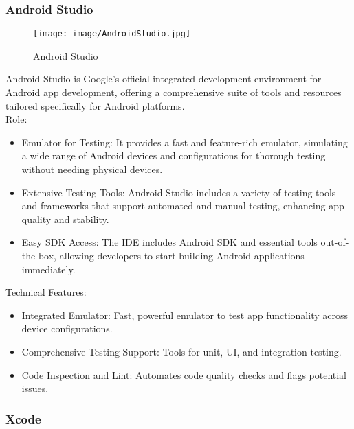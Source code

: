 \documentclass[conference]{IEEEtran}
\begin{document}
\subsubsection{Android Studio}

\begin{figure}[h!]
    \centering
    \texttt{[image: image/AndroidStudio.jpg]}
    \caption{Android Studio}
    \label{fig:enter-label}
\end{figure}

\noindent Android Studio is Google’s official integrated development environment for Android app development, offering a comprehensive suite of tools and resources tailored specifically for Android platforms.\\

Role:
\begin{itemize}
    \item Emulator for Testing: It provides a fast and feature-rich emulator, simulating a wide range of Android devices and configurations for thorough testing without needing physical devices.\\
    \item Extensive Testing Tools: Android Studio includes a variety of testing tools and frameworks that support automated and manual testing, enhancing app quality and stability.\\
    \item Easy SDK Access: The IDE includes Android SDK and essential tools out-of-the-box, allowing developers to start building Android applications immediately.
\end{itemize}

Technical Features:
\begin{itemize}
    \item Integrated Emulator: Fast, powerful emulator to test app functionality across device configurations.\\
    \item Comprehensive Testing Support: Tools for unit, UI, and integration testing.\\
    \item Code Inspection and Lint: Automates code quality checks and flags potential issues.\\
\end{itemize}



\subsubsection{Xcode}
\end{document}
